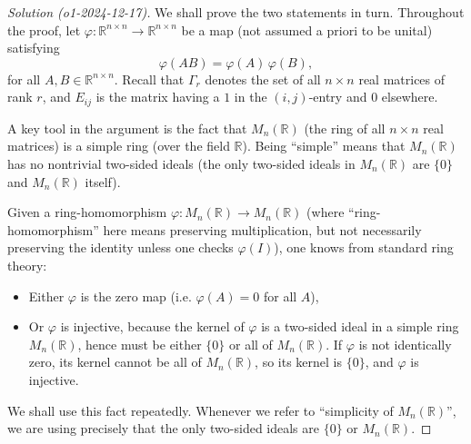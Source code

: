 \documentclass[11pt]{article}
\numberwithin{equation}{section}
\begin{document}
\begin{proof}[Solution (o1-2024-12-17)]
    We shall prove the two statements in turn.  Throughout the proof, let $\varphi\colon \mathbb{R}^{n\times n} \to \mathbb{R}^{n\times n}$ be a map (not assumed a priori to be unital) satisfying  
\[
\varphi(AB) = \varphi(A)\,\varphi(B),
\]
for all $A,B\in \mathbb{R}^{n\times n}$.  Recall that $\Gamma_r$ denotes the set of all $n\times n$ real matrices of rank $r$, and $E_{ij}$ is the matrix having a $1$ in the $(i,j)$-entry and $0$ elsewhere.


A key tool in the argument is the fact that $M_n(\mathbb{R})$ (the ring of all $n\times n$ real matrices) is a simple ring (over the field $\mathbb{R}$).  Being ``simple'' means that $M_n(\mathbb{R})$ has no nontrivial two-sided ideals (the only two-sided ideals in $M_n(\mathbb{R})$ are $\{0\}$ and $M_n(\mathbb{R})$ itself).

Given a ring-homomorphism $\varphi\colon M_n(\mathbb{R}) \to M_n(\mathbb{R})$ (where ``ring-homomorphism'' here means preserving multiplication, but not necessarily preserving the identity unless one checks $\varphi(I)$), one knows from standard ring theory:

\begin{itemize}
\item Either $\varphi$ is the zero map (i.e. $\varphi(A)=0$ for all $A$),
\item Or $\varphi$ is injective, because the kernel of $\varphi$ is a two-sided ideal in a simple ring $M_n(\mathbb{R})$, hence must be either $\{0\}$ or all of $M_n(\mathbb{R})$.  If $\varphi$ is not identically zero, its kernel cannot be all of $M_n(\mathbb{R})$, so its kernel is $\{0\}$, and $\varphi$ is injective.
\end{itemize}

We shall use this fact repeatedly.  Whenever we refer to ``simplicity of $M_n(\mathbb{R})$'', we are using precisely that the only two-sided ideals are $\{0\}$ or $M_n(\mathbb{R})$.



\end{proof}
\end{document}
